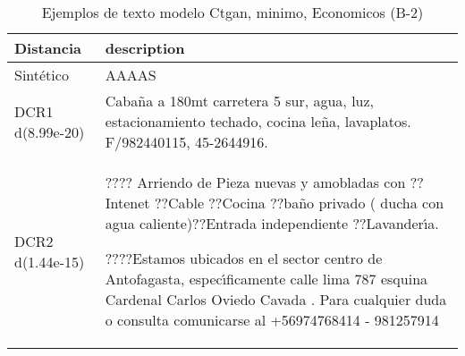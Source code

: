 \begin{table}[H]
\centering
\fontsize{10}{14}\selectfont
\caption{Ejemplos de texto modelo Ctgan, minimo, Economicos (B-2)}
\label{table-example-economicos-b-2-ctgan-min-text}
\begin{tabular}{|l|m{35em}|}
\hline
\rowcolor[gray]{0.8}
Distancia & description \\
\hline Sintético & AAAAS \\
\hline DCR1 d(8.99e-20) & Caba\~na a 180mt carretera 5 sur, agua, luz, estacionamiento techado, cocina le\~na, lavaplatos. F/982440115, 45-2644916. \\
\hline DCR2 d(1.44e-15) & ???? Arriendo de Pieza nuevas y amobladas con 
??Intenet  ??Cable   ??Cocina ??ba\~no privado ( ducha con agua caliente)??Entrada independiente ??Lavander{\'\i}a.

????Estamos ubicados en el sector centro de Antofagasta,  espec{\'\i}ficamente calle lima 787 esquina Cardenal Carlos Oviedo Cavada . Para cualquier duda o consulta comunicarse al +56974768414 - 981257914 \\
\hline
\end{tabular}
\end{table}
